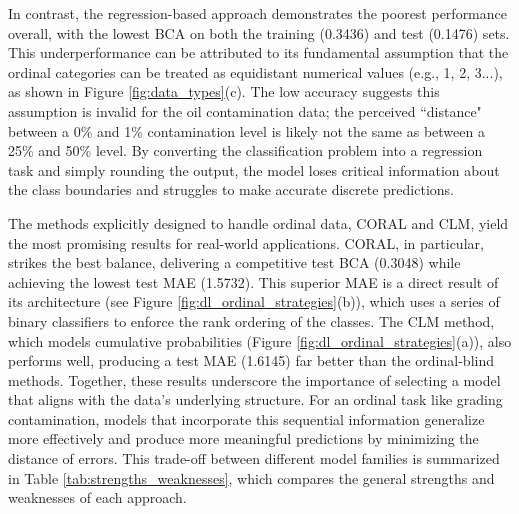 In contrast, the regression-based approach demonstrates the poorest performance overall, with the lowest BCA on both the training (0.3436) and test (0.1476) sets. This underperformance can be attributed to its fundamental assumption that the ordinal categories can be treated as equidistant numerical values (e.g., 1, 2, 3...), as shown in Figure \ref{fig:data_types}(c). The low accuracy suggests this assumption is invalid for the oil contamination data; the perceived ``distance" between a 0\% and 1\% contamination level is likely not the same as between a 25\% and 50\% level. By converting the classification problem into a regression task and simply rounding the output, the model loses critical information about the class boundaries and struggles to make accurate discrete predictions.

The methods explicitly designed to handle ordinal data, CORAL and CLM, yield the most promising results for real-world applications. CORAL, in particular, strikes the best balance, delivering a competitive test BCA (0.3048) while achieving the lowest test MAE (1.5732). This superior MAE is a direct result of its architecture (see Figure \ref{fig:dl_ordinal_strategies}(b)), which uses a series of binary classifiers to enforce the rank ordering of the classes. The CLM method, which models cumulative probabilities (Figure \ref{fig:dl_ordinal_strategies}(a)), also performs well, producing a test MAE (1.6145) far better than the ordinal-blind methods. Together, these results underscore the importance of selecting a model that aligns with the data's underlying structure. For an ordinal task like grading contamination, models that incorporate this sequential information generalize more effectively and produce more meaningful predictions by minimizing the distance of errors. This trade-off between different model families is summarized in Table \ref{tab:strengths_weaknesses}, which compares the general strengths and weaknesses of each approach.

